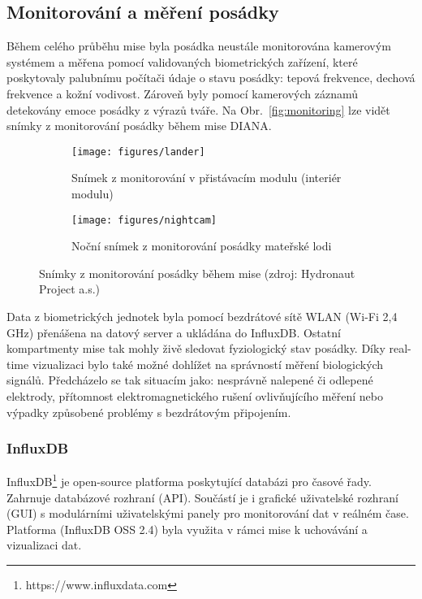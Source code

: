 \subsection{Monitorování a měření posádky}
\label{subsec:monitorovani posadky}
Během celého průběhu mise byla posádka neustále monitorována kamerovým systémem
a měřena pomocí validovaných biometrických zařízení, které poskytovaly palubnímu
počítači údaje o stavu posádky: tepová frekvence, dechová frekvence a kožní
vodivost. Zároveň byly pomocí kamerových záznamů detekovány emoce posádky z
výrazů tváře. Na Obr.~\ref{fig:monitoring} lze vidět snímky z monitorování
posádky během mise DIANA.

\begin{figure}[h]
    \begin{subfigure}[h]{0.48\linewidth}
        \texttt{[image: figures/lander]}
        \caption{Snímek z monitorování v přistávacím modulu (interiér modulu)}
    \end{subfigure}
    \hfill
    \begin{subfigure}[h]{0.48\linewidth}
        \texttt{[image: figures/nightcam]}
        \caption{Noční snímek z monitorování posádky mateřské lodi}
    \end{subfigure}
    \caption{Snímky z monitorování posádky během mise (zdroj: Hydronaut Project a.s.)}
\end{figure}

Data z biometrických jednotek byla pomocí bezdrátové sítě WLAN (Wi-Fi 2,4 GHz)
přenášena na datový server a ukládána do InfluxDB. Ostatní kompartmenty mise tak
mohly živě sledovat fyziologický stav posádky. Díky real-time vizualizaci bylo
také možné dohlížet na správností měření biologických signálů. Předcházelo se
tak situacím jako: nesprávně nalepené či odlepené elektrody, přítomnost
elektromagnetického rušení ovlivňujícího měření nebo výpadky způsobené problémy
s bezdrátovým připojením.

\subsubsection{InfluxDB}
\label{subsec:influx}
InfluxDB\footnote{https://www.influxdata.com} je open-source platforma
poskytující databázi pro časové řady. Zahrnuje databázové rozhraní (API).
Součástí je i grafické uživatelské rozhraní (GUI) s modulárními uživatelskými
panely pro monitorování dat v reálném čase. Platforma (InfluxDB OSS 2.4) byla
využita v rámci mise k uchovávání a vizualizaci dat.

